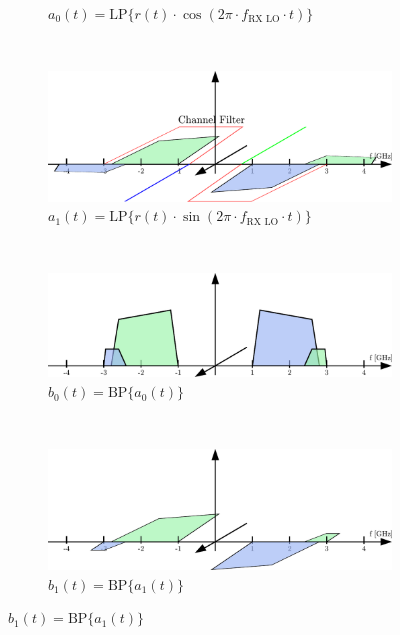 \begin{figure}[p]
\begin{subfigure}{0.45\textwidth}
    \caption{$a_0(t) = \text{LP}\{r(t) \cdot \cos(2\pi \cdot f_{\text{RX LO}} \cdot t)\}$}
    \label{fig:rx_2_freq_a_0}
  \end{subfigure}
  ~
  \begin{subfigure}{0.45\textwidth}
    \centering
    \includegraphics[width=\textwidth]{figures/rx_2_freq_a_1}
    \caption{$a_1(t) = \text{LP}\{r(t) \cdot \sin(2\pi \cdot f_{\text{RX LO}} \cdot t)\}$}
    \label{fig:rx_2_freq_a_1}
  \end{subfigure}
  \vspace{4ex} \\
  \begin{subfigure}{0.45\textwidth}
    \centering
    \includegraphics[width=\textwidth]{figures/rx_2_freq_b_0}
    \caption{$b_0(t) = \text{BP}\{a_0(t)\}$}
    \label{fig:rx_2_freq_b_0}
  \end{subfigure}
  ~
  \begin{subfigure}{0.45\textwidth}
    \centering
    \includegraphics[width=\textwidth]{figures/rx_2_freq_b_1}
    \caption{$b_1(t) = \text{BP}\{a_1(t)\}$}
    \label{fig:rx_2_freq_b_1}
  \end{subfigure}

\end{figure}
